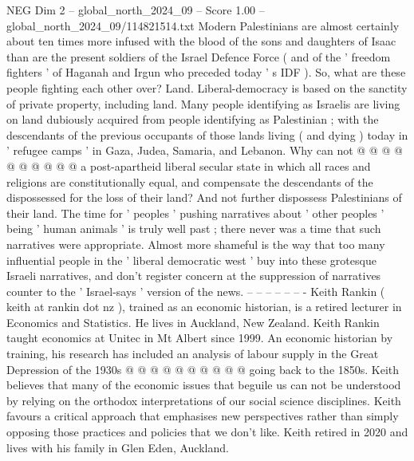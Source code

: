 \begin{textsample}{NEG Dim 2 – global\_north\_2024\_09 – Score 1.00 – global\_north\_2024\_09/114821514.txt}
Modern Palestinians are almost certainly about ten times more infused with the blood of the sons and daughters of Isaac than are the present soldiers of the Israel Defence Force ( and of the ' freedom fighters ' of Haganah and Irgun who preceded today ' s IDF ).
So, what are these people fighting each other over?
Land.
Liberal-democracy is based on the sanctity of private property, including land.
Many people identifying as Israelis are living on land dubiously acquired from people identifying as Palestinian ; with the descendants of the previous occupants of those lands living ( and dying ) today in ' refugee camps ' in Gaza, Judea, Samaria, and Lebanon.
Why can not @ @ @ @ @ @ @ @ @ @ a post-apartheid liberal secular state in which all races and religions are constitutionally equal, and compensate the descendants of the dispossessed for the loss of their land?
And not further dispossess Palestinians of their land.
The time for ' peoples ' pushing narratives about ' other peoples ' being ' human animals ' is truly well past ; there never was a time that such narratives were appropriate.
Almost more shameful is the way that too many influential people in the ' liberal democratic west ' buy into these grotesque Israeli narratives, and don't register concern at the suppression of narratives counter to the ' Israel-says ' version of the news. -- -- -- -- -- -- - Keith Rankin ( keith at rankin dot nz ), trained as an economic historian, is a retired lecturer in Economics and Statistics.
He lives in Auckland, New Zealand.
Keith Rankin taught economics at Unitec in Mt Albert since 1999.
An economic historian by training, his research has included an analysis of labour supply in the Great Depression of the 1930s @ @ @ @ @ @ @ @ @ @ going back to the 1850s.
Keith believes that many of the economic issues that beguile us can not be understood by relying on the orthodox interpretations of our social science disciplines.
Keith favours a critical approach that emphasises new perspectives rather than simply opposing those practices and policies that we don't like.
Keith retired in 2020 and lives with his family in Glen Eden, Auckland.

\end{textsample}
